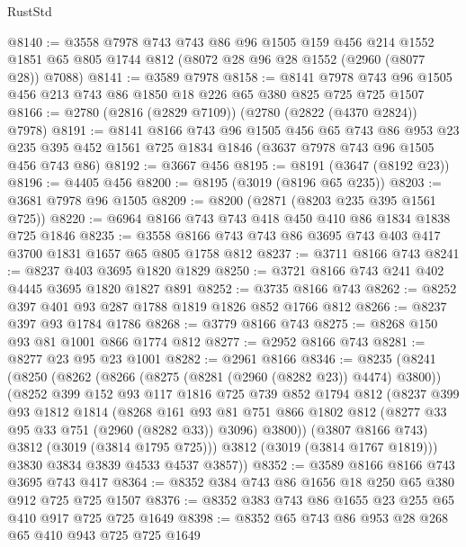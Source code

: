 \begin{lexlean}{RustStd}
\begin{coremodule}
@8140 := @3558
    @7978
    @743
    @743
    @86
    @96
    @1505
    @159
    @456
    @214
    @1552
    @1851
    @65
    @805
    @1744
    @812
    (@8072 @28 @96 @28 @1552 (@2960 (@8077 @28)) @7088)
@8141 := @3589 @7978
@8158 := @8141 @7978 @743 @96 @1505 @456 @213 @743 @86 @1850 @18 @226 @65 @380 @825 @725 @725 @1507
@8166 := @2780 (@2816 (@2829 @7109)) (@2780 (@2822 (@4370 @2824)) @7978)
@8191 := @8141
    @8166
    @743
    @96
    @1505
    @456
    @65
    @743
    @86
    @953
    @23
    @235
    @395
    @452
    @1561
    @725
    @1834
    @1846
    (@3637 @7978 @743 @96 @1505 @456 @743 @86)
@8192 := @3667 @456
@8195 := @8191 (@3647 (@8192 @23))
@8196 := @4405 @456
@8200 := @8195 (@3019 (@8196 @65 @235))
@8203 := @3681 @7978 @96 @1505
@8209 := @8200 (@2871 (@8203 @235 @395 @1561 @725))
@8220 := @6964 @8166 @743 @743 @418 @450 @410 @86 @1834 @1838 @725 @1846
@8235 := @3558 @8166 @743 @743 @86 @3695 @743 @403 @417 @3700 @1831 @1657 @65 @805 @1758 @812
@8237 := @3711 @8166 @743
@8241 := @8237 @403 @3695 @1820 @1829
@8250 := @3721 @8166 @743 @241 @402 @4445 @3695 @1820 @1827 @891
@8252 := @3735 @8166 @743
@8262 := @8252 @397 @401 @93 @287 @1788 @1819 @1826 @852 @1766 @812
@8266 := @8237 @397 @93 @1784 @1786
@8268 := @3779 @8166 @743
@8275 := @8268 @150 @93 @81 @1001 @866 @1774 @812
@8277 := @2952 @8166 @743
@8281 := @8277 @23 @95 @23 @1001
@8282 := @2961 @8166
@8346 := @8235
    (@8241
      (@8250
        (@8262
          (@8266 (@8275 (@8281 (@2960 (@8282 @23)) @4474) @3800))
          (@8252
            @399
            @152
            @93
            @117
            @1816
            @725
            @739
            @852
            @1794
            @812
            (@8237
              @399
              @93
              @1812
              @1814
              (@8268
                @161
                @93
                @81
                @751
                @866
                @1802
                @812
                (@8277 @33 @95 @33 @751 (@2960 (@8282 @33)) @3096)
                @3800))
            (@3807 @8166 @743)
            @3812
            (@3019 (@3814 @1795 @725)))
          @3812
          (@3019 (@3814 @1767 @1819)))
        @3830
        @3834
        @3839
        @4533
        @4537
        @3857))
@8352 := @3589 @8166 @8166 @743 @3695 @743 @417
@8364 := @8352 @384 @743 @86 @1656 @18 @250 @65 @380 @912 @725 @725 @1507
@8376 := @8352 @383 @743 @86 @1655 @23 @255 @65 @410 @917 @725 @725 @1649
@8398 := @8352
    @65
    @743
    @86
    @953
    @28
    @268
    @65
    @410
    @943
    @725
    @725
    @1649

\end{coremodule}
\end{lexlean}
